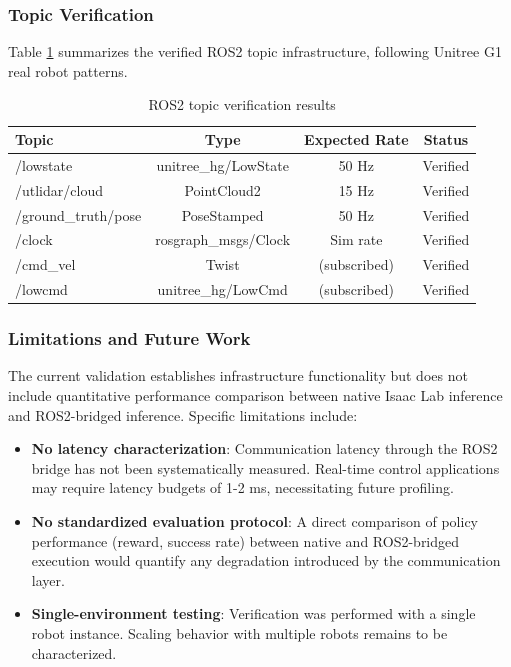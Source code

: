 \documentclass[12pt,a4paper]{article}
\begin{document}
\subsubsection{Topic Verification}

Table \ref{tab:ros2_topics_verification} summarizes the verified ROS2 topic infrastructure, following Unitree G1 real robot patterns.

\begin{table}[H]
\centering
\caption{ROS2 topic verification results}
\label{tab:ros2_topics_verification}
\begin{tabular}{lccc}
\toprule
\textbf{Topic} & \textbf{Type} & \textbf{Expected Rate} & \textbf{Status} \\
\midrule
/lowstate & unitree\_hg/LowState & 50 Hz & Verified \\
/utlidar/cloud & PointCloud2 & 15 Hz & Verified \\
/ground\_truth/pose & PoseStamped & 50 Hz & Verified \\
/clock & rosgraph\_msgs/Clock & Sim rate & Verified \\
/cmd\_vel & Twist & (subscribed) & Verified \\
/lowcmd & unitree\_hg/LowCmd & (subscribed) & Verified \\
\bottomrule
\end{tabular}
\end{table}

\subsubsection{Limitations and Future Work}

The current validation establishes infrastructure functionality but does not include quantitative performance comparison between native Isaac Lab inference and ROS2-bridged inference. Specific limitations include:

\begin{itemize}
    \item \textbf{No latency characterization}: Communication latency through the ROS2 bridge has not been systematically measured. Real-time control applications may require latency budgets of 1-2 ms, necessitating future profiling.
    \item \textbf{No standardized evaluation protocol}: A direct comparison of policy performance (reward, success rate) between native and ROS2-bridged execution would quantify any degradation introduced by the communication layer.
    \item \textbf{Single-environment testing}: Verification was performed with a single robot instance. Scaling behavior with multiple robots remains to be characterized.
\end{itemize}
\end{document}
